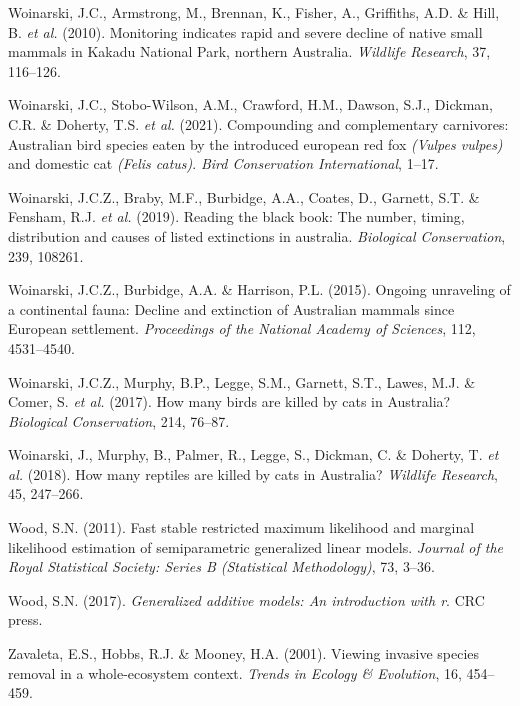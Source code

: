\documentclass[11pt,a4paper,titlepage,twoside,openright]{style/unimelbthesis}
\begin{document}
\begin{mainmatter}
\leavevmode\hypertarget{ref-woinarski2010monitoring}{}%
Woinarski, J.C., Armstrong, M., Brennan, K., Fisher, A., Griffiths, A.D. \& Hill, B. \emph{et al.} (2010). Monitoring indicates rapid and severe decline of native small mammals in Kakadu National Park, northern Australia. \emph{Wildlife Research}, 37, 116--126.

\leavevmode\hypertarget{ref-woinarski2021compounding}{}%
Woinarski, J.C., Stobo-Wilson, A.M., Crawford, H.M., Dawson, S.J., Dickman, C.R. \& Doherty, T.S. \emph{et al.} (2021). Compounding and complementary carnivores: Australian bird species eaten by the introduced european red fox \emph{(Vulpes vulpes)} and domestic cat \emph{(Felis catus)}. \emph{Bird Conservation International}, 1--17.

\leavevmode\hypertarget{ref-woinarski2019reading}{}%
Woinarski, J.C.Z., Braby, M.F., Burbidge, A.A., Coates, D., Garnett, S.T. \& Fensham, R.J. \emph{et al.} (2019). Reading the black book: The number, timing, distribution and causes of listed extinctions in australia. \emph{Biological Conservation}, 239, 108261.

\leavevmode\hypertarget{ref-woinarski2015ongoing}{}%
Woinarski, J.C.Z., Burbidge, A.A. \& Harrison, P.L. (2015). Ongoing unraveling of a continental fauna: Decline and extinction of Australian mammals since European settlement. \emph{Proceedings of the National Academy of Sciences}, 112, 4531--4540.

\leavevmode\hypertarget{ref-woinarski2017birds}{}%
Woinarski, J.C.Z., Murphy, B.P., Legge, S.M., Garnett, S.T., Lawes, M.J. \& Comer, S. \emph{et al.} (2017). How many birds are killed by cats in Australia? \emph{Biological Conservation}, 214, 76--87.

\leavevmode\hypertarget{ref-woinarski2018reptiles}{}%
Woinarski, J., Murphy, B., Palmer, R., Legge, S., Dickman, C. \& Doherty, T. \emph{et al.} (2018). How many reptiles are killed by cats in Australia? \emph{Wildlife Research}, 45, 247--266.

\leavevmode\hypertarget{ref-wood2011fast}{}%
Wood, S.N. (2011). Fast stable restricted maximum likelihood and marginal likelihood estimation of semiparametric generalized linear models. \emph{Journal of the Royal Statistical Society: Series B (Statistical Methodology)}, 73, 3--36.

\leavevmode\hypertarget{ref-wood2017generalized}{}%
Wood, S.N. (2017). \emph{Generalized additive models: An introduction with r}. CRC press.

\leavevmode\hypertarget{ref-zavaleta2001viewing}{}%
Zavaleta, E.S., Hobbs, R.J. \& Mooney, H.A. (2001). Viewing invasive species removal in a whole-ecosystem context. \emph{Trends in Ecology \& Evolution}, 16, 454--459.


\end{mainmatter}
\end{document}
